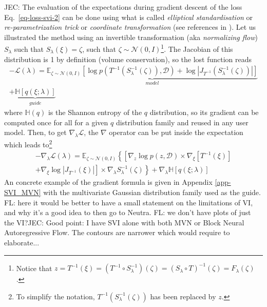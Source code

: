 \documentclass[twocolumn,twocolappendix,nofootinbib,iop]{openjournal}
\newcommand{\FrL}[1]{{\color{cyan}FL: #1}}
\newcommand{\JEC}[1]{{\color{magenta}JEC: #1}}
\begin{document}
\JEC{
The evaluation of the expectations during gradient descent of the loss Eq.~\ref{eq-loss-svi-2} can be done using what is called \textit{elliptical standardisation} or \textit{re-parametrization trick} or \textit{coordinate transformation} (see references in \cite{2015arXiv150603431K}).  Let us illustrated the method using an invertible transformation (aka \textit{normalizing flow})  $S_\lambda$ such that $S_\lambda(\xi)=\zeta$, such that $\zeta\sim \mathcal{N}(0,I)$\footnote{Notice that $z=T^{-1}(\xi)=(T^{-1} \circ S_\lambda^{-1})(\zeta)=(S_\lambda \circ T)^{-1}(\zeta)=F_\lambda(\zeta)$.}. The Jacobian of this distribution is 1 by definition (volume conservation), so the lost function reads
\begin{multline}
-\mathcal{L}(\lambda) = \underbrace{\mathbb{E}_{\zeta\sim \mathcal{N}(0,I)}\left[ \log p(T^{-1}(S_\lambda^{-1}(\zeta)),\mathcal{D}) + \log |J_{T^{-1}}(S_\lambda^{-1}(\zeta))| \right]}_{model} \\ + \underbrace{\mathbb{H}[q(\xi;\lambda)]}_{guide}
\label{eq-loss-svi-3}
\end{multline}
where $\mathbb{H}(q)$ is the Shannon entropy of the $q$ distribution, so its gradient can be computed once for all for a given $q$ distribution family and reused in any user model.  
Then,
to get $\nabla_\lambda \mathcal{L}$, the $\nabla$ operator can be put inside the expectation which leads to\footnote{To simplify the notation, $T^{-1}(S_\lambda^{-1}(\zeta))$ has been replaced by $z$.}
\begin{multline}
-\nabla_\lambda\mathcal{L}(\lambda) = \mathbb{E}_{\zeta\sim \mathcal{N}(0,I)}\left\{
\left[ \nabla_z \log p(z,\mathcal{D}) \times \nabla_\xi[T^{-1}(\xi)] \right. \right. \\
+ \left. \left. \nabla_\xi \log|J_{T^{-1}}(\xi)| \right] \times \nabla_\lambda S_\lambda^{-1}(\zeta)
\right\}
+ \nabla_\lambda \mathbb{H}[q(\xi;\lambda)]
\label{eq-loss-svi-4}
\end{multline}
An concrete example of the gradient formula is given in Appendix \ref{app-SVI_MVN} with the multivariate Gaussian distribution family used as the guide.
}%
%
\FrL{here it would be better to have a small statement on the limitations of VI, and why it's a good idea to then go to Neutra.} 
\FrL{we don't have plots of just the VI?}\JEC{Good point: I have SVI alone with both MVN or Block Neural Autoregressive Flow. The contours are narrower which would require to elaborate...}
\end{document}
